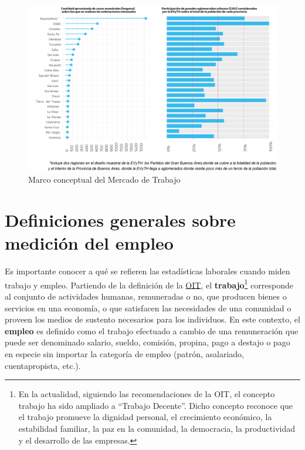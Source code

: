 \documentclass[
  openany]{book}
\begin{document}
\begin{figure}

{\centering \includegraphics[width=0.8\linewidth]{imagenes/figura2.1} 

}

\caption{Marco conceptual del Mercado de Trabajo}\label{fig:empleooit}
\end{figure}

\hypertarget{definiciones-generales-sobre-mediciuxf3n-del-empleo}{%
\section{Definiciones generales sobre medición del empleo}\label{definiciones-generales-sobre-mediciuxf3n-del-empleo}}

Es importante conocer a qué se refieren las estadísticas laborales cuando miden trabajo y empleo. Partiendo de la definición de la \href{https://www.ilo.org/global/lang--es/index.htm}{OIT}, el \textbf{trabajo}\footnote{En la actualidad, siguiendo las recomendaciones de la OIT, el concepto trabajo ha sido ampliado a ``Trabajo Decente''. Dicho concepto reconoce que el trabajo promueve la dignidad personal, el crecimiento económico, la estabilidad familiar, la paz en la comunidad, la democracia, la productividad y el desarrollo de las empresas.} corresponde al conjunto de actividades humanas, remuneradas o no, que producen bienes o servicios en una economía, o que satisfacen las necesidades de una comunidad o proveen los medios de sustento necesarios para los individuos. En este contexto, el \textbf{empleo} es definido como el trabajo efectuado a cambio de una remuneración que puede ser denominado salario, sueldo, comisión, propina, pago a destajo o pago en especie sin importar la categoría de empleo (patrón, asalariado, cuentapropista, etc.).
\end{document}
